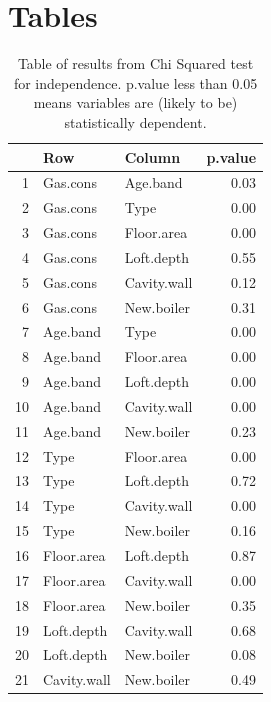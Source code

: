 \documentclass[9pt]{extarticle}
\begin{document}
\section{Tables}

\begin{table}[ht]
	\centering
	\begin{tabular}{rllr}
		\hline
		& Row & Column & p.value \\ 
		\hline
		1 & Gas.cons & Age.band & 0.03 \\ 
		2 & Gas.cons & Type & 0.00 \\ 
		3 & Gas.cons & Floor.area & 0.00 \\ 
		4 & Gas.cons & Loft.depth & 0.55 \\ 
		5 & Gas.cons & Cavity.wall & 0.12 \\ 
		6 & Gas.cons & New.boiler & 0.31 \\ 
		7 & Age.band & Type & 0.00 \\ 
		8 & Age.band & Floor.area & 0.00 \\ 
		9 & Age.band & Loft.depth & 0.00 \\ 
		10 & Age.band & Cavity.wall & 0.00 \\ 
		11 & Age.band & New.boiler & 0.23 \\ 
		12 & Type & Floor.area & 0.00 \\ 
		13 & Type & Loft.depth & 0.72 \\ 
		14 & Type & Cavity.wall & 0.00 \\ 
		15 & Type & New.boiler & 0.16 \\ 
		16 & Floor.area & Loft.depth & 0.87 \\ 
		17 & Floor.area & Cavity.wall & 0.00 \\ 
		18 & Floor.area & New.boiler & 0.35 \\ 
		19 & Loft.depth & Cavity.wall & 0.68 \\ 
		20 & Loft.depth & New.boiler & 0.08 \\ 
		21 & Cavity.wall & New.boiler & 0.49 \\ 
		\hline
	\end{tabular}
\caption{Table of results from Chi Squared test for independence. p.value less than 0.05 means variables are (likely to be) statistically dependent.}
\label{tab:chi}
\end{table}
\end{document}
